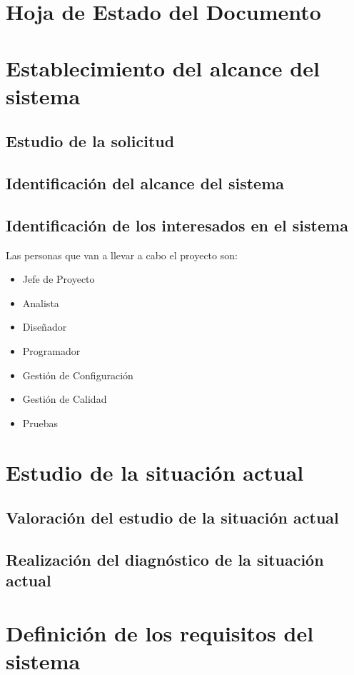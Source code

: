 \documentclass[10pt,a4paper,oldfontcommands]{apuntes}
\begin{document}
\pagecolor{fondo}
\color{principal}


\section*{Hoja de Estado del Documento}

\section{Establecimiento del alcance del sistema}
\subsection{Estudio de la solicitud}
\subsection{Identificación del alcance del sistema}
\subsection{Identificación de los interesados en el sistema}
\par Las personas que van a llevar a cabo el proyecto son:
\begin{itemize}[-]
\item Jefe de Proyecto
\item Analista
\item Diseñador
\item Programador
\item Gestión de Configuración
\item Gestión de Calidad
\item Pruebas
\end{itemize}

\section{Estudio de la situación actual}
\subsection{Valoración del estudio de la situación actual}
\subsection{Realización del diagnóstico de la situación actual}


\section{Definición de los requisitos del sistema}
\end{document}
